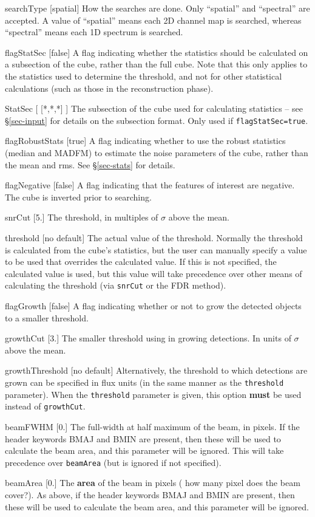 \begin{Lentry}
\item[{searchType [spatial]}] How the searches are done. Only
  ``spatial'' and ``spectral'' are accepted. A value of ``spatial''
  means each 2D channel map is searched, whereas ``spectral'' means
  each 1D spectrum is searched.
\item[{flagStatSec [false]}] A flag indicating whether the
  statistics should be calculated on a subsection of the cube, rather
  than the full cube. Note that this only applies to the statistics
  used to determine the threshold, and not for other statistical
  calculations (such as those in the reconstruction phase).
\item[{StatSec [ [*,*,*] ]}] The subsection of the cube used
  for calculating statistics -- see \S\ref{sec-input} for details on
 the subsection format. Only used if \texttt{flagStatSec=true}.
\item[{flagRobustStats [true]}] A flag indicating whether to use the
  robust statistics (median and MADFM) to estimate the noise
  parameters of the cube, rather than the mean and rms. See
  \S\ref{sec-stats} for details.
\item[{flagNegative [false]}] A flag indicating that the
  features of interest are negative. The cube is inverted prior to
  searching.
\item[{snrCut [5.]}] The threshold, in multiples of $\sigma$ above
  the mean.
\item[{threshold [no default]}] The actual value of the
  threshold. Normally the threshold is calculated from the cube's
  statistics, but the user can manually specify a value to be used
  that overrides the calculated value. If this is not specified, the
  calculated value is used, but this value will take precedence over
  other means of calculating the threshold (\ie via \texttt{snrCut} or
  the FDR method).
\item[{flagGrowth [false]}] A flag indicating whether or not to
  grow the detected objects to a smaller threshold.
\item[{growthCut [3.]}] The smaller threshold using in growing
  detections. In units of $\sigma$ above the mean.
\item[{growthThreshold [no default]}] Alternatively, the threshold to
  which detections are grown can be specified in flux units (in the
  same manner as the \texttt{threshold} parameter). When the
  \texttt{threshold} parameter is given, this option \textbf{must} be
  used instead of \texttt{growthCut}.
\item[{beamFWHM [0.]}] The full-width at half maximum of the beam, in
  pixels.  If the header keywords BMAJ and BMIN are present, then
  these will be used to calculate the beam area, and this parameter
  will be ignored. This will take precedence over \texttt{beamArea}
  (but is ignored if not specified).
\item[{beamArea [0.]}] The \textbf{area} of the beam in pixels (\ie
  how many pixel does the beam cover?). As above, if the header
  keywords BMAJ and BMIN are present, then these will be used to
  calculate the beam area, and this parameter will be ignored. 
\end{Lentry}

